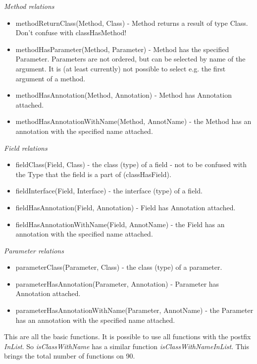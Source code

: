 \emph{Method relations}
\begin{itemize}
	\item methodReturnClass(Method, Class) - Method returns a result of type Class. Don't confuse with classHasMethod!
  \item methodHasParameter(Method, Parameter) - Method has the specified Parameter. Parameters are not ordered, but can be selected by name of the argument. It is (at least currently) not possible to select e.g. the first argument of a method.
  \item methodHasAnnotation(Method, Annotation) - Method has Annotation attached.
  \item methodHasAnnotationWithName(Method, AnnotName) - the Method has an annotation with the specified name attached.
\end{itemize}

\emph{Field relations}
\begin{itemize}
	\item fieldClass(Field, Class) - the class (type) of a field - not to be confused with the Type that the field is a part of (classHasField).
  \item fieldInterface(Field, Interface) - the interface (type) of a field.
  \item fieldHasAnnotation(Field, Annotation) - Field has Annotation attached.
  \item fieldHasAnnotationWithName(Field, AnnotName) - the Field has an annotation with the specified name attached.
\end{itemize}

\emph{Parameter relations}
\begin{itemize}
	\item parameterClass(Parameter, Class) - the class (type) of a parameter.
  \item parameterHasAnnotation(Parameter, Annotation) - Parameter has Annotation attached.
  \item parameterHasAnnotationWithName(Parameter, AnnotName) - the Parameter has an annotation with the specified name attached.
\end{itemize}

This are all the basic functions. It is possible to use all functions with the postfix \emph{InList}.
So \emph{isClassWithName} has a similar function \emph{isClassWithNameInList}. This brings
the total number of functions on 90.